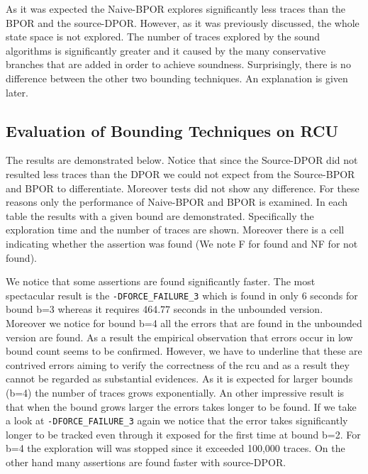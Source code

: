 As it was expected the Naive-BPOR explores significantly less traces than the BPOR and the source-DPOR. However, as it was previously discussed, the whole
state space is not explored. The number of traces explored by the sound algorithms is significantly greater and it caused by the many conservative branches that are
added in order to achieve soundness. Surprisingly, there is no difference between the other two bounding techniques. An explanation is given later.

\subsection{Evaluation of Bounding Techniques on RCU}
The results are demonstrated below. Notice that since the Source-DPOR did not resulted less traces than the DPOR we could not expect from the Source-BPOR and BPOR
to differentiate. Moreover tests did not show any difference. For these reasons only the performance of Naive-BPOR and BPOR is examined. In each table
the results with a given bound are demonstrated. Specifically the exploration time and the number of traces are shown. 
Moreover there is a cell indicating whether the assertion was found (We note F for found and NF for not found).




We notice that some assertions are found significantly faster. The most spectacular result is the \verb|-DFORCE_FAILURE_3| which is found in only 6 seconds for bound b=3 whereas it requires 464.77 seconds in the unbounded version. Moreover we notice for bound b=4 all the errors that are found in the unbounded version are
found. As a result the empirical observation that errors occur in low bound count seems to be confirmed. However, we have to underline that these are contrived
errors aiming to verify the correctness of the rcu and as a result they cannot be regarded as substantial evidences. As it is expected for larger bounds (b=4) the number of traces
grows exponentially. An other impressive result is that when the bound grows larger the errors takes longer to be found. If we take a look at \verb|-DFORCE_FAILURE_3| again we notice that the error
takes significantly longer to be tracked even through it exposed for the first time at bound b=2. For b=4 the exploration will was stopped since it exceeded 100,000 traces.
On the other hand many assertions are found faster with source-DPOR.

